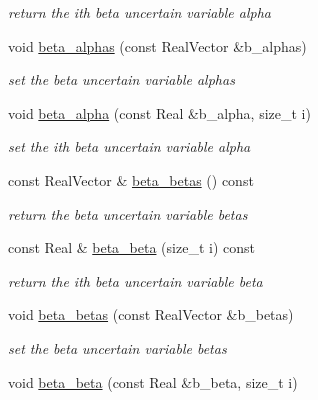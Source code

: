 \begin{DoxyCompactItemize}
\begin{DoxyCompactList}\small\item\em return the ith beta uncertain variable alpha \end{DoxyCompactList}\item 
void \hyperlink{classPecos_1_1AleatoryDistParams_a81034c532836ac6ef6d1de897ef1a9b6}{beta\+\_\+alphas} (const Real\+Vector \&b\+\_\+alphas)\label{classPecos_1_1AleatoryDistParams_a81034c532836ac6ef6d1de897ef1a9b6}

\begin{DoxyCompactList}\small\item\em set the beta uncertain variable alphas \end{DoxyCompactList}\item 
void \hyperlink{classPecos_1_1AleatoryDistParams_af947f5cc4b7eab21cdedbbb07b1cdcdc}{beta\+\_\+alpha} (const Real \&b\+\_\+alpha, size\+\_\+t i)\label{classPecos_1_1AleatoryDistParams_af947f5cc4b7eab21cdedbbb07b1cdcdc}

\begin{DoxyCompactList}\small\item\em set the ith beta uncertain variable alpha \end{DoxyCompactList}\item 
const Real\+Vector \& \hyperlink{classPecos_1_1AleatoryDistParams_a057fd73ba88caea249a566f2b1bb9085}{beta\+\_\+betas} () const \label{classPecos_1_1AleatoryDistParams_a057fd73ba88caea249a566f2b1bb9085}

\begin{DoxyCompactList}\small\item\em return the beta uncertain variable betas \end{DoxyCompactList}\item 
const Real \& \hyperlink{classPecos_1_1AleatoryDistParams_a86b9b6a575df209e7455f81f1b5e2c2c}{beta\+\_\+beta} (size\+\_\+t i) const \label{classPecos_1_1AleatoryDistParams_a86b9b6a575df209e7455f81f1b5e2c2c}

\begin{DoxyCompactList}\small\item\em return the ith beta uncertain variable beta \end{DoxyCompactList}\item 
void \hyperlink{classPecos_1_1AleatoryDistParams_a6fa166d97a14479f663c7a97739f9c3a}{beta\+\_\+betas} (const Real\+Vector \&b\+\_\+betas)\label{classPecos_1_1AleatoryDistParams_a6fa166d97a14479f663c7a97739f9c3a}

\begin{DoxyCompactList}\small\item\em set the beta uncertain variable betas \end{DoxyCompactList}\item 
void \hyperlink{classPecos_1_1AleatoryDistParams_a118729ef50bf1791e7454f074318af1c}{beta\+\_\+beta} (const Real \&b\+\_\+beta, size\+\_\+t i)\label{classPecos_1_1AleatoryDistParams_a118729ef50bf1791e7454f074318af1c}


\end{DoxyCompactItemize}

